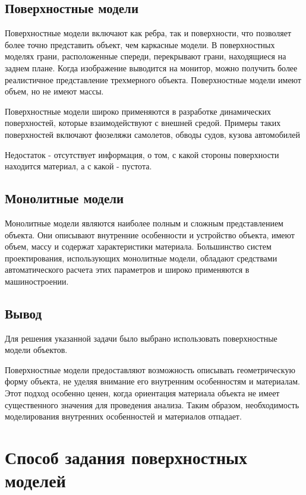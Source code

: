 \subsection{Поверхностные модели}

Поверхностные модели включают как ребра, так и поверхности, что позволяет более точно представить объект, чем каркасные модели. В поверхностных моделях грани, расположенные спереди, перекрывают грани, находящиеся на заднем плане. Когда изображение выводится на монитор, можно получить более реалистичное представление трехмерного объекта. Поверхностные модели имеют объем, но не имеют массы.

Поверхностные модели широко применяются в разработке динамических поверхностей, которые взаимодействуют с внешней средой. Примеры таких поверхностей включают фюзеляжи самолетов, обводы судов, кузова автомобилей

Недостаток - отсутствует информация, о том, с какой стороны поверхности находится материал, а с какой - пустота.

\subsection{Монолитные модели}

Монолитные модели являются наиболее полным и сложным представлением объекта. Они описывают внутренние особенности и устройство объекта, имеют объем, массу и содержат характеристики материала. Большинство систем проектирования, использующих монолитные модели, обладают средствами автоматического расчета этих параметров и широко применяются в машиностроении.



\subsection{Вывод}

Для решения указанной задачи было выбрано использовать  поверхностные модели объектов.

Поверхностные модели предоставляют возможность описывать геометрическую форму объекта, не уделяя внимание его внутренним особенностям и материалам. Этот подход особенно ценен, когда ориентация материала объекта не имеет существенного значения для проведения анализа. Таким образом, необходимость моделирования внутренних особенностей и материалов отпадает.


\section{Способ задания поверхностных моделей}

